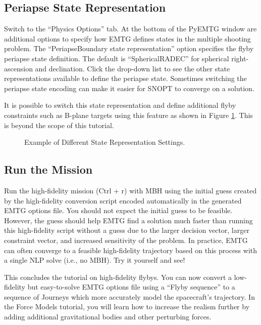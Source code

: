 \documentclass[11pt]{article}
\begin{document}
\subsection{Periapse State Representation}
\label{sec:periapse_state_representation}

Switch to the ``Physics Options'' tab. At the bottom of the PyEMTG window are additional options to specify how \ac{EMTG} defines states in the multiple shooting problem. The ``PeriapseBoundary state representation'' option specifies the flyby periapse state definition. The default is ``SphericalRADEC'' for spherical right-ascension and declination. Click the drop-down list to see the other state representations available to define the periapse state. Sometimes switching the periapse state encoding can make it easier for \acs{SNOPT} to converge on a solution.

\noindent It is possible to switch this state representation and define additional flyby constraints such as B-plane targets using this feature as shown in Figure \ref{fig:state_representation_settings}. This is beyond the scope of this tutorial.

\begin{figure}[H]
	\centering
	\caption{\label{fig:state_representation_settings}Example of Different State Representation Settings.}
\end{figure}

\subsection{Run the Mission}
\label{sec:run_the_mission_high_fidelity}

Run the high-fidelity mission (Ctrl + r) with \acs{MBH} using the initial guess created by the high-fidelity conversion script encoded automatically in the generated \ac{EMTG} options file. You should not expect the initial guess to be feasible. However, the guess should help \ac{EMTG} find a solution much faster than running this high-fidelity script without a guess due to the larger decision vector, larger constraint vector, and increased sensitivity of the problem. In practice, \ac{EMTG} can often converge to a feasible high-fidelity trajectory based on this process with a single \acs{NLP} solve (i.e., no \acs{MBH}). Try it yourself and see! 

\noindent This concludes the tutorial on high-fidelity flybys. You can now convert a low-fidelity but easy-to-solve \ac{EMTG} options file using a ``Flyby sequence'' to a sequence of Journeys which more accurately model the spacecraft’s trajectory. In the Force Models tutorial, you will learn how to increase the realism further by adding additional gravitational bodies and other perturbing forces.
\end{document}

